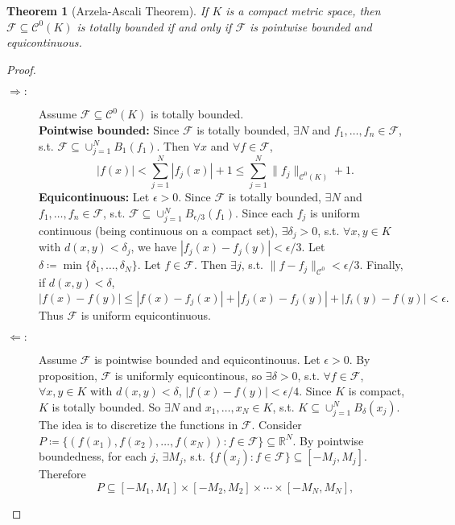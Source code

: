 \documentclass[12pt]{article}
\theoremstyle{plain}
\newtheorem{thm}{Theorem}
\theoremstyle{definition}
\begin{document}
\begin{thm}[Arzela-Ascali Theorem]
    If $K$ is a compact metric space, then $\mathcal{F}\subseteq
    \mathcal{C}^0(K)$ is totally bounded if and only if $\mathcal{F}$ is
    pointwise bounded and equicontinuous.
\end{thm}
\begin{proof}
    \begin{description}
    \item[$\Rightarrow:$]
        Assume $\mathcal{F}\subseteq\mathcal{C}^0(K)$ is totally bounded.\\
        \textbf{Pointwise bounded:}
        Since $\mathcal{F}$ is totally bounded, $\exists N$ and
        $f_1,\ldots,f_n\in\mathcal{F}$, s.t. $\mathcal{F}\subseteq\cup_{j=1}^N
        B_1(f_1)$.
        Then $\forall x$ and $\forall f\in\mathcal{F}$,
        $$|f(x)|<\sum_{j=1}^N|f_j(x)|+1\leq\sum_{j=1}^N\|f_j\|_{\mathcal{C}^0(K)}+1.$$
        \textbf{Equicontinuous:}
        Let $\epsilon>0$.
        Since $\mathcal{F}$ is totally bounded, $\exists N$ and
        $f_1,\ldots,f_n\in\mathcal{F}$, s.t. $\mathcal{F}\subseteq\cup_{j=1}^N
        B_{\epsilon/3}(f_1)$.
        Since each $f_j$ is uniform continuous (being continuous on a compact
        set), $\exists \delta_j>0$, s.t. $\forall x,y\in K$ with
        $d(x,y)<\delta_j$, we have $|f_j(x)-f_j(y)|<\epsilon/3$.
        Let $\delta\coloneqq\min\{\delta_1,\ldots,\delta_N\}$.
        Let $f\in\mathcal{F}$.
        Then $\exists j$, s.t. $\|f-f_j\|_{\mathcal{C}^0}<\epsilon/3$.
        Finally, if $d(x,y)<\delta$,
        $$|f(x)-f(y)|\leq|f(x)-f_j(x)|+|f_j(x)-f_j(y)|+|f_i(y)-f(y)|<\epsilon.$$
        Thus $\mathcal{F}$ is uniform equicontinuous.
    \item[$\Leftarrow:$]
        Assume $\mathcal{F}$ is pointwise bounded and equicontinouus.
        Let $\epsilon>0$.
        By proposition, $\mathcal{F}$ is uniformly equicontinous, so
        $\exists\delta>0$, s.t. $\forall f\in \mathcal{F}$, $\forall x,y\in K$
        with $d(x,y)<\delta$, $|f(x)-f(y)|<\epsilon/4$.
        Since $K$ is compact, $K$ is totally bounded.
        So $\exists N$ and $x_1,\ldots,x_N\in K$, s.t. $K\subseteq\cup_{j=1}^N
        B_{\delta}(x_j)$.
        The idea is to discretize the functions in $\mathcal{F}$.
        Consider
        $P\coloneqq\{(f(x_1),f(x_2),\ldots,f(x_N)):f\in\mathcal{F}\}\subseteq\mathbb{R}^N$.
        By pointwise boundedness, for each $j$, $\exists M_j$, s.t.
        $\{f(x_j):f\in\mathcal{F}\}\subseteq[-M_j,M_j]$.
        Therefore
        $$P\subseteq[-M_1,M_1]\times[-M_2,M_2]\times\cdots\times[-M_N,M_N],$$

\end{description}
\end{proof}
\end{document}
